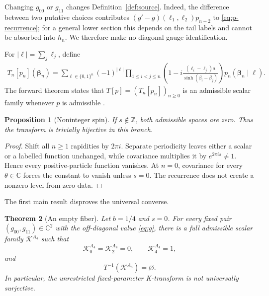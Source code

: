 \documentclass[11pt,reqno]{amsart}
\newtheorem{theorem}{Theorem}[section]
\newtheorem{proposition}[theorem]{Proposition}
\theoremstyle{definition}
\theoremstyle{remark}
\newcommand{\C}{\mathbb C}
\newcommand{\Z}{\mathbb Z}
\newcommand{\cK}{\mathcal K}
\begin{document}
Changing $g_{00}$ or $g_{11}$ changes Definition~\ref{def:source}.  Indeed,
the difference between two putative choices contributes
$(g'-g)(\ell_1,\ell_2)p_{n-2}$ to \eqref{eq:p-recurrence}; for a general
lower section this depends on the tail labels and cannot be absorbed into
$h_n$.  We therefore make no diagonal-gauge identification.

For $|\boldsymbol\ell|=\sum_j\ell_j$, define
\begin{align}
 T_n[p_n](\boldsymbol\beta_n)
  =\sum_{\boldsymbol\ell\in\{0,1\}^n}
  (-1)^{|\boldsymbol\ell|}
  \prod_{1\le i<j\le n}
  \left(1-i\frac{(\ell_i-\ell_j)a}
  {\sinh(\beta_i-\beta_j)}\right)
  p_n(\boldsymbol\beta_n\mid\boldsymbol\ell).
 \label{eq:transform}
\end{align}
The forward theorem states that $T[p]=(T_n[p_n])_{n\ge0}$ is an admissible
scalar family whenever $p$ is admissible
\cite[Prop.~2.3]{Kozlowski_2023ba}.

\begin{proposition}[Noninteger spin]
\label{prop:noninteger}
If $s\notin\Z$, both admissible spaces are zero.  Thus the transform is
trivially bijective in this branch.
\end{proposition}

\begin{proof}
Shift all $n\ge1$ rapidities by $2\pi i$.  Separate periodicity leaves either
a scalar or a labelled function unchanged, while covariance multiplies it by
$e^{2\pi i s}\ne1$.  Hence every positive-particle function vanishes.  At
$n=0$, covariance for every $\theta\in\C$ forces the constant to vanish unless
$s=0$.  The recurrence does not create a nonzero level from zero data.
\end{proof}

The first main result disproves the universal converse.

\begin{theorem}[An empty fiber]
\label{thm:empty}
Let $b=1/4$ and $s=0$.  For every fixed pair
$(g_{00},g_{11})\in\C^2$ with the off-diagonal value \eqref{eq:g}, there is a
full admissible scalar family $\cK^{A_4}$ such that
\begin{equation}
 \cK^{A_4}_0=\cK^{A_4}_2=0,
 \qquad \cK^{A_4}_4=1,
 \label{eq:A4-prefix}
\end{equation}
and
\begin{equation}
 T^{-1}(\cK^{A_4})=\varnothing.
\end{equation}
In particular, the unrestricted fixed-parameter K-transform is not universally
surjective.
\end{theorem}
\end{document}
